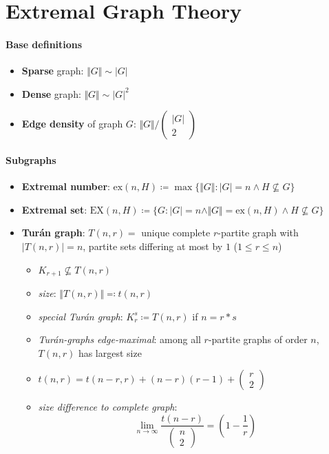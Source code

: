 \section{Extremal Graph Theory}

\paragraph{Base definitions}
\begin{itemize}
  \item \textbf{Sparse} graph: $ \Vert G \Vert \sim \vert G \vert $ 
  \item \textbf{Dense} graph: $ \Vert G \Vert \sim \vert G \vert^2 $
  \item \textbf{Edge density} of graph $ G $: $ \Vert G \Vert / \left(\begin{smallmatrix}
    \vert G \vert \\ 2
  \end{smallmatrix}\right) $
\end{itemize}

\paragraph{Subgraphs}
\begin{itemize}
  \item \textbf{Extremal number}: $ \text{ex}(n,H) \coloneqq \max\{ \Vert G \Vert : \vert G \vert = n \wedge H \not \subseteq G \} $
  \item \textbf{Extremal set}: $ \text{EX}(n,H) \coloneqq \{ G : \vert G \vert = n \wedge \Vert G \Vert = \text{ex}(n,H) \wedge H \not \subseteq G \} $
  \item \textbf{Turán graph}: $ T(n,r) = $ unique complete $ r $-partite graph with $ \vert T(n,r) \vert = n $, partite sets differing at most by $ 1 $ ($ 1 \leq r \leq n $)
  \begin{itemize}
    \item $ K_{r+1} \not \subseteq T(n,r) $
    \item \emph{size}: $ \Vert T(n,r) \Vert \eqqcolon t(n,r) $ 
    \item \emph{special Turán graph}: $ K_r^s \coloneqq T(n,r) $ if $ n = r*s $
    \item \emph{Turán-graphs edge-maximal}: among all $ r $-partite graphs of order $ n $, $ T(n,r) $ has largest size
    \item $ t(n,r) = t(n-r,r) + (n-r)(r-1) + \left( \begin{smallmatrix}
      r \\ 2
    \end{smallmatrix} \right) $
    \item \emph{size difference to complete graph}:
    \begin{equation*}
      \lim_{n \to \infty} \frac{t(n-r)}{\left( \begin{smallmatrix}
        n \\ 2
      \end{smallmatrix} \right)} = \left( 1 - \frac{1}{r} \right)
    \end{equation*}
  \end{itemize}
\end{itemize}